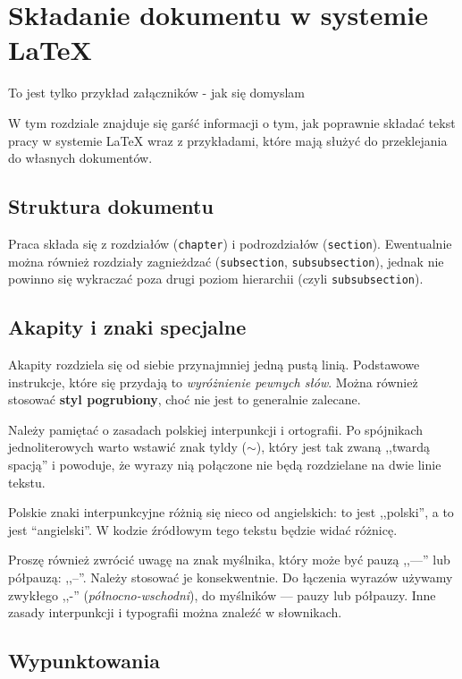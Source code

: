 
\chapter{Składanie dokumentu w systemie \LaTeX}

To jest tylko przykład załączników - jak się domyslam

W tym rozdziale znajduje się
garść informacji o tym, jak poprawnie składać tekst pracy w systemie \LaTeX{} wraz z 
przykładami, które mają służyć do przeklejania do własnych dokumentów.

\section{Struktura dokumentu}

Praca składa się z rozdziałów (\texttt{chapter}) i podrozdziałów (\texttt{section}).
Ewentualnie można również rozdziały zagnieżdzać (\texttt{subsection}, \texttt{subsubsection}),
jednak nie powinno się wykraczać poza drugi poziom hierarchii (czyli \texttt{subsubsection}).

\section{Akapity i znaki specjalne}

Akapity rozdziela się od siebie przynajmniej jedną pustą linią. Podstawowe
instrukcje, które się przydają to \emph{wyróżnienie pewnych słów}. Można również
stosować \textbf{styl pogrubiony}, choć nie jest to generalnie zalecane.

Należy pamiętać o zasadach polskiej interpunkcji i ortografii. Po spójnikach 
jednoliterowych warto wstawić znak tyldy ($\sim$), który jest tak zwaną
,,twardą spacją'' i powoduje, że wyrazy nią połączone nie będą rozdzielane
na dwie linie tekstu.

Polskie znaki interpunkcyjne różnią się nieco od angielskich: to jest ,,polski'', a to jest
``angielski''. W kodzie źródłowym tego tekstu będzie widać różnicę.

Proszę również zwrócić uwagę na znak myślnika, który może być pauzą ,,---'' lub
półpauzą: ,,--''. Należy stosować je konsekwentnie. Do łączenia wyrazów używamy
zwykłego ,,-'' (\emph{północno-wschodni}), do myślników --- pauzy lub półpauzy.
Inne zasady interpunkcji i typografii można znaleźć w słownikach.

\section{Wypunktowania}

